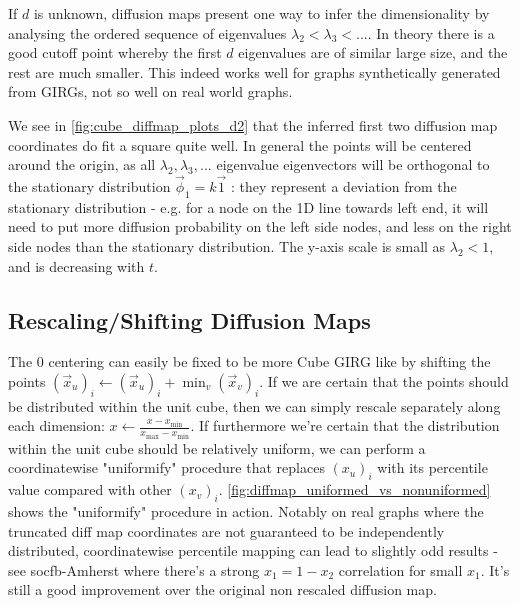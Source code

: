 If $d$ is unknown, diffusion maps present one way to infer the dimensionality by analysing the ordered sequence of eigenvalues $\lambda_2 < \lambda_3 < ...$. In theory there is a good cutoff point whereby the first $d$ eigenvalues are of similar large size, and the rest are much smaller. This indeed works well for graphs synthetically generated from GIRGs, not so well on real world graphs.


We see in \cref{fig:cube_diffmap_plots_d2} that the inferred first two diffusion map coordinates do fit a square quite well. In general the points will be centered around the origin, as all $\lambda_2, \lambda_3, ...$ eigenvalue eigenvectors will be orthogonal to the stationary distribution $\vec{\phi}_1 = k \vec{1}$ : they represent a deviation from the stationary distribution - e.g. for a node on the 1D line towards left end, it will need to put more diffusion probability on the left side nodes, and less on the right side nodes than the stationary distribution. The y-axis scale is small as $\lambda_2 < 1$, and is decreasing with $t$.

\subsection{Rescaling/Shifting Diffusion Maps}
The 0 centering can easily be fixed to be more Cube GIRG like by shifting the points $(\vec{x}_u)_i \gets (\vec{x}_u)_i + \min_v (\vec{x}_v)_i$.
If we are certain that the points should be distributed within the unit cube, then we can simply rescale separately along each dimension: $x \gets \frac{x - x_{\min}}{x_{\max} - x_{\min}}$.
If furthermore we're certain that the distribution within the unit cube should be relatively uniform, we can perform a coordinatewise "uniformify" procedure that replaces $(x_u)_i$ with its percentile value compared with other $(x_v)_i$. \cref{fig:diffmap_uniformed_vs_nonuniformed} shows the "uniformify" procedure in action. Notably on real graphs where the truncated diff map coordinates are not guaranteed to be independently distributed, coordinatewise percentile mapping can lead to slightly odd results - see socfb-Amherst where there's a strong $x_1 = 1 - x_2$ correlation for small $x_1$. It's still a good improvement over the original non rescaled diffusion map.


